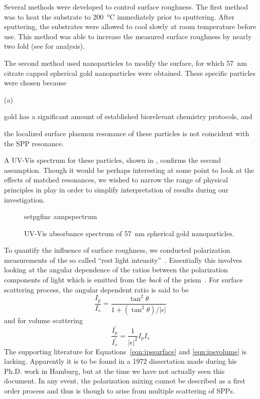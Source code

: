 Several methods were developed to control surface roughness.  The first
method was to heat the substrate to \SI{200}{\celsius} immediately prior to
sputtering.  After sputtering, the substrates were allowed to cool slowly
at room temperature before use.  This method was able to increase the
measured surface roughness by nearly two fold (see
 for analysis).

The second method used nanoparticles to modify the surface, for which
\SI{57}{\nano\meter} citrate capped spherical gold nanoparticles were
obtained.  These specific particles were chosen because
\begin{inparaenum}{(a)}
\item gold has a significant amount of established biorelevant chemistry
				protocols, and
\item the localized surface plasmon resonance of these particles is not
				coincident with the SPP resonance.
\end{inparaenum}
A UV-Vis spectrum for these particles, shown in ,
confirms the second assumption.  Though it would be perhaps interesting at
some point to look at the effects of matched resonances, we wished to
narrow the range of physical principles in play in order to simplify
interpretation of results during our investigation.
\begin{figure}[ht]
 \centering
 {setpgfinc}
 {aunpspectrum}
 \caption{UV-Vis absorbance spectrum of \SI{57}{\nano\meter} spherical gold
 nanoparticles.}
 \label{fig:aunpspectrum}
\end{figure}

To quantify the influence of surface roughness, we conducted polarization
measurements of the so called ``rest light
intensity''~\cite{horstmann1977multiple}.  Essentially this involves
looking at the angular dependence of the ratios between the polarization
components of light which is emitted from the \textit{back} of the
prism~\cite{kretschmann1972decay}.
For surface scattering process, the angular dependent ratio is said to be
\begin{equation}
\frac{I_p}{I_s} = \frac{\tan^2\theta}{1+(\tan^2\theta)/|\epsilon|}
\label{eqn:ipssurface}
\end{equation}
and for volume scattering
\begin{equation}
\frac{I^\prime_p}{I^\prime_s} = \frac{1}{|\epsilon|^2} I_p I_s
\label{eqn:ipsvolume}
\end{equation}
The supporting literature for Equations~\ref{eqn:ipssurface} and
\ref{eqn:ipsvolume} is lacking.  Apparently it is to be found in a 1972
dissertation  made during his Ph.D. work in Hamburg, but
at the time we have not actually seen this document.  In any event, the
polarization mixing cannot be described as a first order process and thus
is though to arise from multiple scattering of SPPs.


